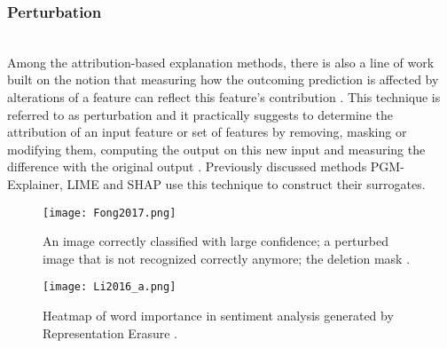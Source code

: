 \documentclass[journal]{IEEEtran}
\begin{document}
\subsubsection{Perturbation}
\hfill\\
Among the attribution-based explanation methods, there is also a line of work built on the notion that measuring how the outcoming prediction is affected by alterations of a feature can reflect this feature's contribution \cite{Du2018}. This technique is referred to as perturbation and it practically suggests to determine the attribution of an input feature or set of features by removing, masking or modifying them, computing the output on this new input and measuring the difference with the original output \cite{Ancona2017}. Previously discussed methods PGM-Explainer, LIME and SHAP use this technique to construct their surrogates.

\begin{figure}
  \texttt{[image: Fong2017.png]}
  \caption{An image correctly classified with large confidence; a perturbed image that is not recognized correctly anymore; the deletion mask \cite{Fong2017}.}
\end{figure}

\begin{figure}
  \texttt{[image: Li2016\_a.png]}
  \caption{Heatmap of word importance in sentiment analysis generated by Representation Erasure \cite{Li2016}.}
\end{figure}
\end{document}

